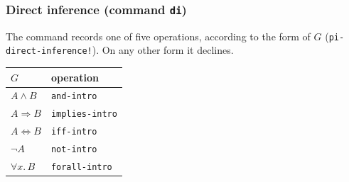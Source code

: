 \subsubsection*{Direct inference (command \texttt{di})}

The command records one of five operations, according to the form of $G$
(\texttt{pi-direct-inference!}).  On any other form it declines.

\begin{center}
\begin{tabular}{@{}ll@{}}
\toprule
$G$ & operation \\
\midrule
$A \wedge B$ & \texttt{and-intro} \\
$A \Rightarrow B$ & \texttt{implies-intro} \\
$A \Leftrightarrow B$ & \texttt{iff-intro} \\
$\neg A$ & \texttt{not-intro} \\
$\forall x.\, B$ & \texttt{forall-intro} \\
\bottomrule
\end{tabular}
\end{center}

\label{kop:and-intro}%
\label{kop:implies-intro}%
\label{kop:iff-intro}%
\label{kop:not-intro}%

